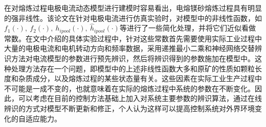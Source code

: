 \documentclass[UTF8, 12pt]{article}
\begin{document}
在对熔炼过程电极电流动态模型进行建模时容易看出，电熔镁砂熔炼过程具有明显的强非线性。该论文在针对电极电流进行仿真实验时，对模型中的非线性函数，如$f_1(\cdot),\ f_2(\cdot),\ h_{ipool}(\cdot),\ \hat{h}_{ipool}(\cdot)$等进行了一些简化处理，并将它们近似看做常数。在文中介绍的具体实验过程中，针对这些常数首先需要使用实际工业过程中大量的电极电流和电机转动方向和频率数据，采用递推最小二乘和神经网络交替辨识方法对电流模型的参数进行预先辨识，然后将辨识得到的参数施加在模型中。这种处理方法存在一个问题，即模型中的上述非线性函数大多和原矿的性质如颗粒长度和杂质成分，以及熔炼过程的某些状态量有关。这些因素在实际工业生产过程中不可能是一成不变的，也就意味着在实际的熔炼过程中系统的参数在不断变化。因此，可以考虑在目前的控制方法基础上加入对系统主要参数的辨识算法，通过在线辨识的方式对模型不断更新和修正，个人认为这样可以提高控制系统对外界环境变化的自适应能力。



% 

% 
\end{document}
